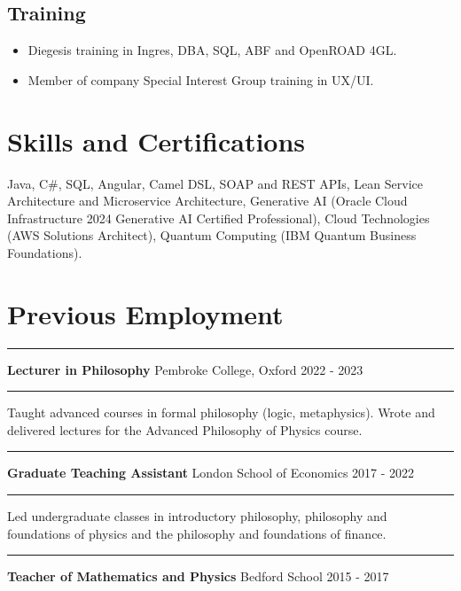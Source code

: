 \documentclass[
  11pt,
  a4paper,
]{article}
\providecommand{\tightlist}{%
  \setlength{\itemsep}{0pt}\setlength{\parskip}{0pt}}
\begin{document}
\subsection{Training}\label{training}

\begin{itemize}
\tightlist
\item
  Diegesis training in Ingres, DBA, SQL, ABF and OpenROAD 4GL.
\item
  Member of company Special Interest Group training in UX/UI.
\end{itemize}

\section{Skills and Certifications}\label{skills-and-certifications}

Java, C\#, SQL, Angular, Camel DSL, SOAP and REST APIs, Lean Service
Architecture and Microservice Architecture, Generative AI (Oracle Cloud
Infrastructure 2024 Generative AI Certified Professional), Cloud
Technologies (AWS Solutions Architect), Quantum Computing (IBM Quantum
Business Foundations).

\section{Previous Employment}\label{previous-employment}

\noindent\rule{\textwidth}{0.4pt}

\textbf{Lecturer in Philosophy} \textbar{} Pembroke College, Oxford
\textbar{} 2022 - 2023

\noindent\rule{\textwidth}{0.4pt}

Taught advanced courses in formal philosophy (logic, metaphysics). Wrote
and delivered lectures for the Advanced Philosophy of Physics course.

\noindent\rule{\textwidth}{0.4pt}

\textbf{Graduate Teaching Assistant} \textbar{} London School of
Economics \textbar{} 2017 - 2022

\noindent\rule{\textwidth}{0.4pt}

Led undergraduate classes in introductory philosophy, philosophy and
foundations of physics and the philosophy and foundations of finance.

\noindent\rule{\textwidth}{0.4pt}

\textbf{Teacher of Mathematics and Physics} \textbar{} Bedford School
\textbar{} 2015 - 2017
\end{document}

